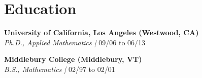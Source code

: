 \section{\sc Education}
{\bf  University of California, Los Angeles (Westwood, CA)} \\
{\it Ph.D., Applied Mathematics |} 09/06 to 06/13 



{\bf Middlebury College (Middlebury, VT)} \\
{\it B.S., Mathematics |} 02/97 to 02/01



